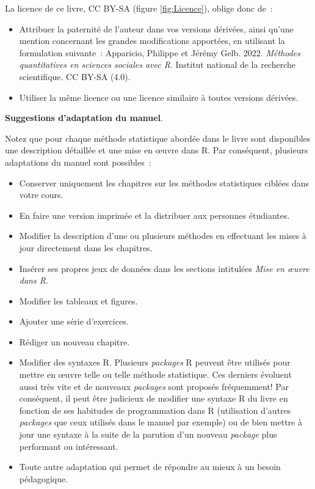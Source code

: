 \documentclass[
  11pt,
  french,
]{book}
\makeatletter
\providecommand{\tightlist}{%
  \setlength{\itemsep}{0pt}\setlength{\parskip}{0pt}}
\newenvironment{kframev}{%
\medskip{}
\setlength{\fboxsep}{.8em}
 \def\at@end@of@kframev{}%
 \ifinner\ifhmode%
  \def\at@end@of@kframev{\end{minipage}}%
  \begin{minipage}{\columnwidth}%
 \fi\fi%
 \def\FrameCommand##1{\hskip\@totalleftmargin \hskip-\fboxsep
 \colorbox{shadebluecolor}{##1}\hskip-\fboxsep
     \hskip-\linewidth \hskip-\@totalleftmargin \hskip\columnwidth}%
 \MakeFramed {\advance\hsize-\width
   \@totalleftmargin\z@ \linewidth\hsize
   \@setminipage}}%
 {\par\unskip\endMakeFramed%
 \at@end@of@kframev}
\newenvironment{rmdblock}[1]
  {
  \begin{itemize}
  \renewcommand{\labelitemi}{
    \raisebox{-.7\height}[0pt][0pt]{
      {\setkeys{Gin}{width=3em,keepaspectratio}\texttt{[image: images/\#1]}}
    }
  }
  \setlength{\fboxsep}{1em}
  \begin{kframev}
  \small
  \item
  }
  {
  \end{kframev}
  \end{itemize}
  }
\newenvironment{bloc_astuce}
  {\begin{rmdblock}{astuce}}
  {\end{rmdblock}}
\makeatother
\begin{document}
La licence de ce livre, CC BY-SA (figure \ref{fig:Licence}), oblige donc de~:

\begin{itemize}
\tightlist
\item
  Attribuer la paternité de l'auteur dans vos versions dérivées, ainsi qu'une mention concernant les grandes modifications apportées, en utilisant la formulation suivante~:
  Apparicio, Philippe et Jérémy Gelb. 2022. \emph{Méthodes quantitatives en sciences sociales avec R}. Institut national de la recherche scientifique. CC BY-SA (4.0).
\item
  Utiliser la même licence ou une licence similaire à toutes versions dérivées.
\end{itemize}

\begin{bloc_astuce}

\textbf{Suggestions d'adaptation du manuel}.

Notez que pour chaque méthode statistique abordée dans le livre sont disponibles une description détaillée et une mise en œuvre dans R. Par conséquent, plusieurs adaptations du manuel sont possibles~:

\begin{itemize}
\tightlist
\item
  Conserver uniquement les chapitres sur les méthodes statistiques ciblées dans votre cours.
\item
  En faire une version imprimée et la distribuer aux personnes étudiantes.
\item
  Modifier la description d'une ou plusieurs méthodes en effectuant les mises à jour directement dans les chapitres.
\item
  Insérer ses propres jeux de données dans les sections intitulées \emph{Mise en œuvre dans R}.
\item
  Modifier les tableaux et figures.
\item
  Ajouter une série d'exercices.
\item
  Rédiger un nouveau chapitre.
\item
  Modifier des syntaxes R. Plusieurs \emph{packages} R peuvent être utilisés pour mettre en œuvre telle ou telle méthode statistique. Ces derniers évoluent aussi très vite et de nouveaux \emph{packages} sont proposés fréquemment! Par conséquent, il peut être judicieux de modifier une syntaxe R du livre en fonction de ses habitudes de programmation dans R (utilisation d'autres \emph{packages} que ceux utilisés dans le manuel par exemple) ou de bien mettre à jour une syntaxe à la suite de la parution d'un nouveau \emph{package} plus performant ou intéressant.
\item
  Toute autre adaptation qui permet de répondre au mieux à un besoin pédagogique.
\end{itemize}


\end{bloc_astuce}
\end{document}
